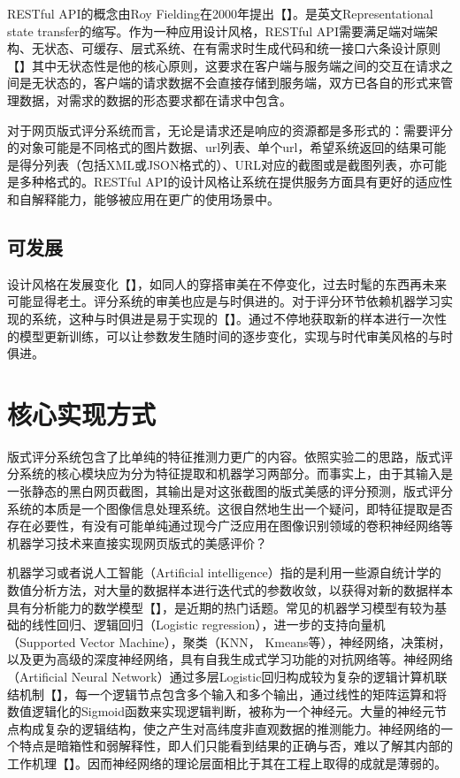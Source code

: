 RESTful API的概念由Roy Fielding在2000年提出【】。是英文Representational state transfer的缩写。作为一种应用设计风格，RESTful API需要满足端对端架构、无状态、可缓存、层式系统、在有需求时生成代码和统一接口六条设计原则【】其中无状态性是他的核心原则，这要求在客户端与服务端之间的交互在请求之间是无状态的，客户端的请求数据不会直接存储到服务端，双方已各自的形式来管理数据，对需求的数据的形态要求都在请求中包含。

对于网页版式评分系统而言，无论是请求还是响应的资源都是多形式的：需要评分的对象可能是不同格式的图片数据、url列表、单个url，希望系统返回的结果可能是得分列表（包括XML或JSON格式的）、URL对应的截图或是截图列表，亦可能是多种格式的。RESTful API的设计风格让系统在提供服务方面具有更好的适应性和自解释能力，能够被应用在更广的使用场景中。

\subsection{可发展}
设计风格在发展变化【】，如同人的穿搭审美在不停变化，过去时髦的东西再未来可能显得老土。评分系统的审美也应是与时俱进的。对于评分环节依赖机器学习实现的系统，这种与时俱进是易于实现的【】。通过不停地获取新的样本进行一次性的模型更新训练，可以让参数发生随时间的逐步变化，实现与时代审美风格的与时俱进。

\section{核心实现方式}
版式评分系统包含了比单纯的特征推测力更广的内容。依照实验二的思路，版式评分系统的核心模块应为分为特征提取和机器学习两部分。而事实上，由于其输入是一张静态的黑白网页截图，其输出是对这张截图的版式美感的评分预测，版式评分系统的本质是一个图像信息处理系统。这很自然地生出一个疑问，即特征提取是否存在必要性，有没有可能单纯通过现今广泛应用在图像识别领域的卷积神经网络等机器学习技术来直接实现网页版式的美感评价？

机器学习或者说人工智能（Artificial intelligence）指的是利用一些源自统计学的数值分析方法，对大量的数据样本进行迭代式的参数收敛，以获得对新的数据样本具有分析能力的数学模型【】，是近期的热门话题。常见的机器学习模型有较为基础的线性回归、逻辑回归（Logistic regression），进一步的支持向量机（Supported Vector Machine），聚类（KNN， Kmeans等），神经网络，决策树，以及更为高级的深度神经网络，具有自我生成式学习功能的对抗网络等。神经网络（Artificial Neural Network）通过多层Logistic回归构成较为复杂的逻辑计算机联结机制【】，每一个逻辑节点包含多个输入和多个输出，通过线性的矩阵运算和将数值逻辑化的Sigmoid函数来实现逻辑判断，被称为一个神经元。大量的神经元节点构成复杂的逻辑结构，使之产生对高纬度非直观数据的推测能力。神经网络的一个特点是暗箱性和弱解释性，即人们只能看到结果的正确与否，难以了解其内部的工作机理【】。因而神经网络的理论层面相比于其在工程上取得的成就是薄弱的。


